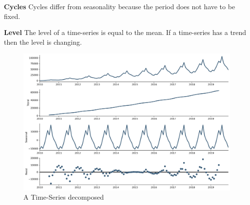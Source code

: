 \textbf{Cycles}
Cycles differ from seasonality because the period does not have to be fixed.


\textbf{Level}
The level of a time-series is equal to the mean. If a time-series has a trend
then the level is changing.



\begin{figure}[h!]
  \centering
  \caption{A Time-Series decomposed}
  \label{fig:example-time-series-decomposed}
  \includegraphics[width=\textwidth]{./figs/illustrations/time-series_example-decomposed.png}
  \hfill
\end{figure}
